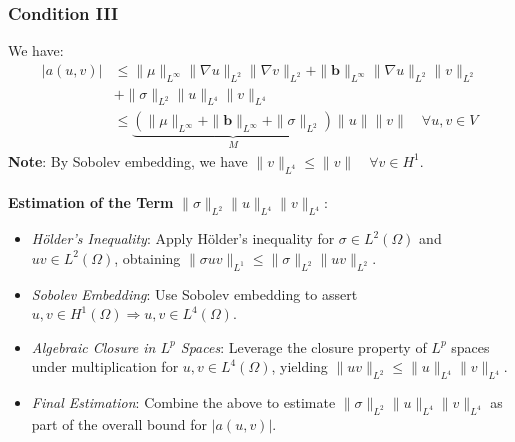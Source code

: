 \documentclass[11pt]{book}
\begin{document}
\subsubsection*{Condition III}
We have:
\begin{align*}
|a(u, v)| & \leq \|\mu\|_{L^{\infty}}\|\nabla u\|_{L^{2}}\|\nabla v\|_{L^{2}}+\|\mathbf{b}\|_{L^{\infty}}\|\nabla u\|_{L^{2}}\|v\|_{L^{2}} \\
& +\|\sigma\|_{L^{2}}\|u\|_{L^{4}}\|v\|_{L^{4}} \\
& \leq \underbrace{\left(\|\mu\|_{L^{\infty}}+\|\mathbf{b}\|_{L^{\infty}}+\|\sigma\|_{L^{2}}\right)}_{M}\|u\|\|v\| \quad \forall u, v \in V
\end{align*}
\textbf{Note}: By Sobolev embedding, we have $\|v\|_{L^{4}} \leq\|v\| \quad \forall v \in H^{1}$. \\ \\
\textbf{Estimation of the Term} $\|\sigma\|_{L^{2}}\|u\|_{L^{4}}\|v\|_{L^{4}}$:
\begin{itemize}
\item \textit{Hölder's Inequality}: Apply Hölder's inequality for $\sigma \in L^2(\Omega)$ and $uv \in L^2(\Omega)$, obtaining $\|\sigma uv\|_{L^1} \leq \|\sigma\|_{L^2} \|uv\|_{L^2}$.
\item \textit{Sobolev Embedding}: Use Sobolev embedding to assert $u, v \in H^1(\Omega) \Rightarrow u, v \in L^4(\Omega)$.
\item \textit{Algebraic Closure in $L^p$ Spaces}: Leverage the closure property of $L^p$ spaces under multiplication for $u, v \in L^4(\Omega)$, yielding $\|uv\|_{L^2} \leq \|u\|_{L^4}\|v\|_{L^4}$.
\item \textit{Final Estimation}: Combine the above to estimate $\|\sigma\|_{L^{2}}\|u\|_{L^{4}}\|v\|_{L^{4}}$ as part of the overall bound for $|a(u, v)|$.
\end{itemize}
\end{document}
